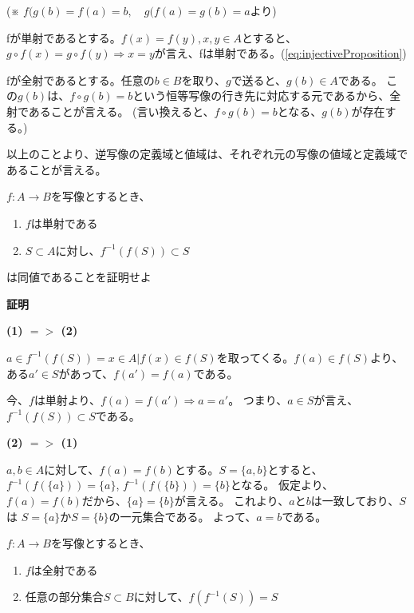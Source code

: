 \documentclass[dvipdfmx,autodetect-engine]{jsarticle}
\begin{document}
(※ $f(g(b) = f(a) = b, \quad g(f(a) = g(b) = a$より)

fが単射であるとする。$f(x) = f(y), x,y \in A$とすると、$g \circ f(x) = g \circ f(y) \Rightarrow x = y$が言え、fは単射である。(\ref{eq:injectiveProposition})

fが全射であるとする。任意の$b \in B$を取り、$g$で送ると、$g(b) \in A$である。
この$g(b)$は、$f \circ g(b) = b$という恒等写像の行き先に対応する元であるから、全射であることが言える。
(言い換えると、$f \circ g(b) = b$となる、$g(b)$が存在する。)

\prop

以上のことより、逆写像の定義域と値域は、それぞれ元の写像の値域と定義域であることが言える。

\exercise

$f:A \to B$を写像とするとき、

\begin{enumerate}
\renewcommand{\labelenumi}{(\arabic{enumi})}
	\item $f$は単射である
	\item $S \subset A$に対し、$f^{-1}(f(S)) \subset S$
\end{enumerate}

は同値であることを証明せよ

{\bf 証明}

{\bf (1) $ => $ (2)}

$a \in f^{-1}(f(S)) = {x \in A | f(x) \in f(S)}$を取ってくる。$f(a) \in f(S)$より、ある$a' \in S$があって、$f(a') = f(a)$である。

今、$f$は単射より、$f(a) = f(a') \Rightarrow a = a'$。
つまり、$a \in S$が言え、$f^{-1}(f(S)) \subset S$である。

{\bf (2) $ => $ (1)}

$a, b \in A$に対して、$f(a) = f(b)$とする。$S = \{a, b\}$とすると、
$f^{-1}(f(\{a\})) = \{a\}$, $f^{-1}(f(\{b\})) = \{b\}$となる。
仮定より、$f(a) = f(b)$だから、$\{a\} = \{b\}$が言える。
これより、$aとb$は一致しており、$S$は $S = \{a\}$か$S = \{b\}$の一元集合である。
よって、$a = b$である。


\exercise

$f:A \to B$を写像とするとき、

\begin{enumerate}
\renewcommand{\labelenumi}{(\arabic{enumi})}
	\item $f$は全射である
	\item 任意の部分集合$S \subset B$に対して、$f(f^{-1}(S)) = S$
\end{enumerate}
\end{document}
